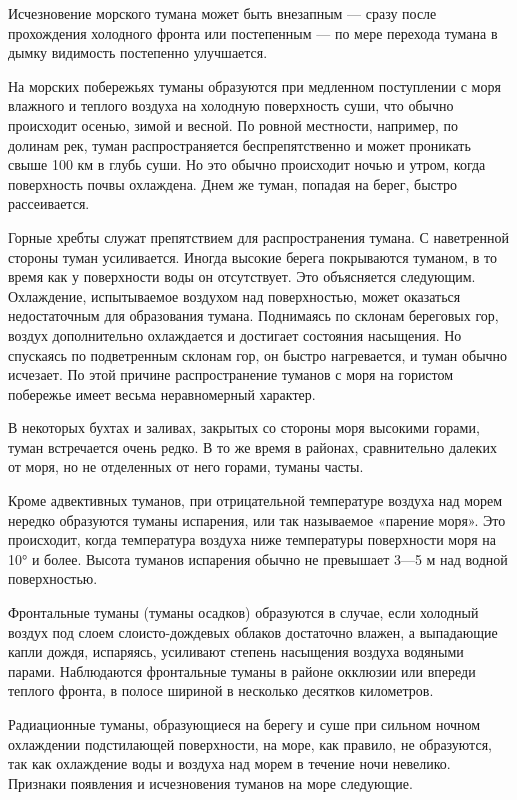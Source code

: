 Исчезновение морского тумана может быть внезапным — сразу после прохождения холодного фронта или постепенным — по мере перехода тумана в дымку видимость постепенно улучшается.

На морских побережьях туманы образуются при медленном поступлении с моря влажного и теплого воздуха на холодную поверхность суши, что обычно происходит осенью, зимой и весной. По ровной местности, например, по долинам рек, туман распространяется беспрепятственно и может проникать свыше 100 км в глубь суши. Но это обычно происходит ночью и утром, когда поверхность почвы охлаждена. Днем же туман, попадая на берег, быстро рассеивается.

Горные хребты служат препятствием для распространения тумана. С наветренной стороны туман усиливается. Иногда высокие берега покрываются туманом, в то время как у поверхности воды он отсутствует. Это объясняется следующим. Охлаждение, испытываемое воздухом над поверхностью, может оказаться недостаточным для образования тумана. Поднимаясь по склонам береговых гор, воздух дополнительно охлаждается и достигает состояния насыщения. Но спускаясь по подветренным склонам гор, он быстро нагревается, и туман обычно исчезает. По этой причине распространение туманов с моря на гористом побережье имеет весьма неравномерный характер.

В некоторых бухтах и заливах, закрытых со стороны моря высокими горами, туман встречается очень редко. В то же время в районах, сравнительно далеких от моря, но не отделенных от него горами, туманы часты.

Кроме адвективных туманов, при отрицательной температуре воздуха над морем нередко образуются туманы испарения, или так называемое «парение моря». Это происходит, когда температура воздуха ниже температуры поверхности моря на 10° и более. Высота туманов испарения обычно не превышает 3—5 м над водной поверхностью.

Фронтальные туманы (туманы осадков) образуются в случае, если холодный воздух под слоем слоисто-дождевых облаков достаточно влажен, а выпадающие капли дождя, испаряясь, усиливают степень насыщения воздуха водяными парами. Наблюдаются фронтальные туманы в районе окклюзии или впереди теплого фронта, в полосе шириной в несколько десятков километров.

Радиационные туманы, образующиеся на берегу и суше при сильном ночном охлаждении подстилающей поверхности, на море, как правило, не образуются, так как охлаждение воды и воздуха над морем в течение ночи невелико. Признаки появления и исчезновения туманов на море следующие.

